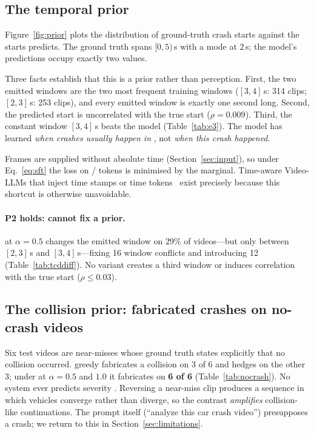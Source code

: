 \subsection{The temporal prior}
\label{sec:prior}

Figure~\ref{fig:prior} plots the distribution of ground-truth crash starts against the starts \crashlogic{} predicts.
The ground truth spans $[0,5)$\,s with a mode at $2$\,s; the model's predictions occupy exactly two values.



Three facts establish that this is a prior rather than perception.
First, the two emitted windows are the two most frequent training windows ($[3,4]$\,s: 314 clips; $[2,3]$\,s: 253 clips), and every emitted window is exactly one second long.
Second, the predicted start is uncorrelated with the true start ($\rho{=}0.009$).
Third, the constant window $[3,4]$\,s beats the model (Table~\ref{tab:e3}).
The model has learned \emph{when crashes usually happen in \dataset{}}, not \emph{when this crash happened}.

Frames are supplied without absolute time (Section~\ref{sec:input}), so under Eq.~\eqref{eq:sft} the loss on / tokens is minimised by the marginal.
Time-aware Video-LLMs that inject time stamps or time tokens~\cite{timechat,vtimellm,lita} exist precisely because this shortcut is otherwise unavoidable.

\paragraph{P2 holds: \tcd{} cannot fix a prior.}
\tcd{} at $\alpha{=}0.5$ changes the emitted window on $29\%$ of videos---but only between $[2,3]$\,s and $[3,4]$\,s---fixing 16 window conflicts and introducing 12 (Table~\ref{tab:tcddiff}).
No variant creates a third window or induces correlation with the true start ($\rho\leq0.03$).

\subsection{The collision prior: fabricated crashes on no-crash videos}
\label{sec:nocrash}

Six test videos are near-misses whose ground truth states explicitly that no collision occurred.
\crashlogic{} greedy fabricates a collision on 3 of 6 and hedges on the other 3; under \tcd{} at $\alpha{=}0.5$ and $1.0$ it fabricates on \textbf{6 of 6} (Table~\ref{tab:nocrash}).
No system ever predicts severity .
Reversing a near-miss clip produces a sequence in which vehicles converge rather than diverge, so the contrast \emph{amplifies} collision-like continuations.
The prompt itself (``analyze this car crash video'') presupposes a crash; we return to this in Section~\ref{sec:limitations}.

